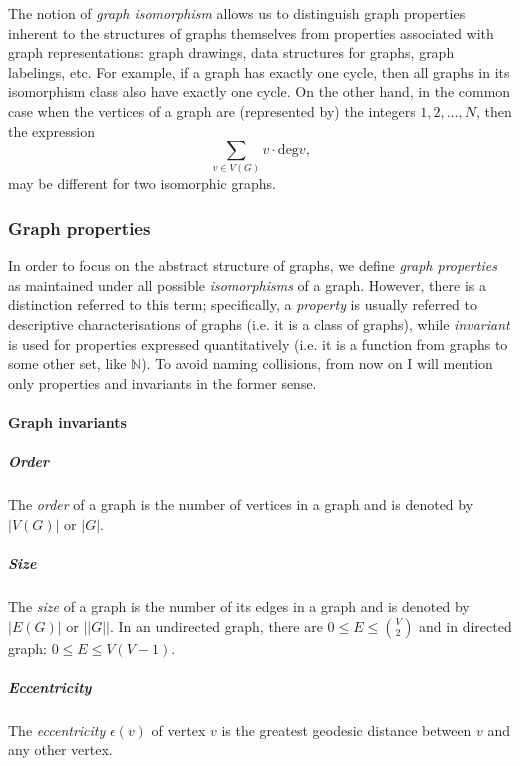       The notion of \emph{graph isomorphism} allows us to distinguish graph properties inherent to the structures of graphs themselves from properties associated with graph representations: graph drawings, data structures for graphs, graph labelings, etc. For example, if a graph has exactly one cycle, then all graphs in its isomorphism class also have exactly one cycle. On the other hand, in the common case when the vertices of a graph are (represented by) the integers $1, 2, \ldots, N$, then the expression
      \begin{equation}
        \sum_{v \in V(G)} v\cdot\mbox{deg} v\mbox{,}
      \end{equation}
      may be different for two isomorphic graphs.

    \subsubsection{Graph properties}

      In order to focus on the abstract structure of graphs, we define \emph{graph properties} as maintained under all possible \emph{isomorphisms} of a graph. However, there is a distinction referred to this term; specifically, a \emph{property} is usually referred to descriptive characterisations of graphs (i.e. it is a class of graphs), while \emph{invariant} is used for properties expressed quantitatively (i.e. it is a function from graphs to some other set, like $\mathbb{N}$). To avoid naming collisions, from now on I will mention only properties and invariants in the former sense. 

      \paragraph{Graph invariants}

        \subparagraph{Order}

          The \emph{order} of a graph is the number of vertices in a graph and is denoted by $|V(G)|$ or $|G|$.
            
        \subparagraph{Size}

          The \emph{size} of a graph is the number of its edges\cite{Harris2000} in a graph and is denoted by $|E(G)|$ or $||G||$. In an undirected graph, there are $0 \leq E \leq \binom{V}{2}$ and in directed graph: $0 \leq E \leq V(V-1)$. 

        \subparagraph{Eccentricity}    

          The \emph{eccentricity} $\epsilon(v)$ of vertex $v$ is the greatest geodesic distance between $v$ and any other vertex.    
                    
